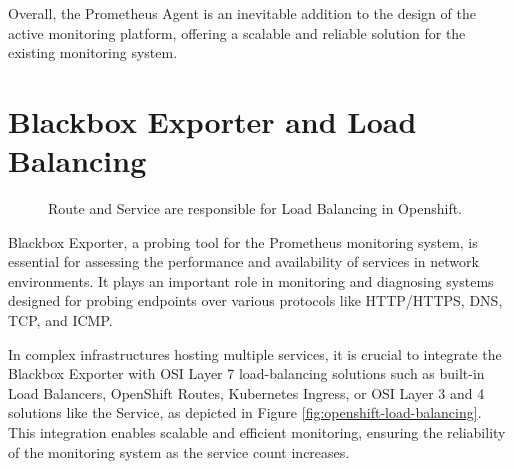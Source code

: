 Overall, the Prometheus Agent is an inevitable addition to the design of the active monitoring platform, offering a scalable and reliable solution for the existing monitoring system.

\section{Blackbox Exporter and Load Balancing}

\begin{figure}[htpb]
  \centering
  \caption[OpenShift Load Balancing]{Route and Service are responsible for Load Balancing in Openshift.}\label{fig:openshift-load-balancing}
\end{figure}

Blackbox Exporter, a probing tool for the Prometheus monitoring system, is essential for assessing the performance and availability of services in network environments. It plays an important role in monitoring and diagnosing systems designed for probing endpoints over various protocols like \ac{HTTP}/\ac{HTTPS}, \ac{DNS}, \ac{TCP}, and \ac{ICMP}. 

In complex infrastructures hosting multiple services, it is crucial to integrate the Blackbox Exporter with OSI Layer 7 load-balancing solutions such as built-in Load Balancers, OpenShift Routes, Kubernetes Ingress, or OSI Layer 3 and 4 solutions like the Service, as depicted in Figure \autoref{fig:openshift-load-balancing}. This integration enables scalable and efficient monitoring, ensuring the reliability of the monitoring system as the service count increases. 

